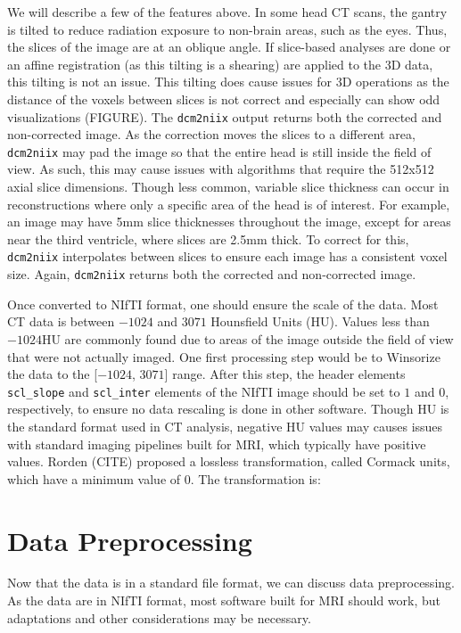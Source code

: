 \documentclass[]{elsarticle} %
\begin{document}
We will describe a few of the features above. In some head CT scans, the
gantry is tilted to reduce radiation exposure to non-brain areas, such
as the eyes. Thus, the slices of the image are at an oblique angle. If
slice-based analyses are done or an affine registration (as this tilting
is a shearing) are applied to the 3D data, this tilting is not an issue.
This tilting does cause issues for 3D operations as the distance of the
voxels between slices is not correct and especially can show odd
visualizations (FIGURE). The \texttt{dcm2niix} output returns both the
corrected and non-corrected image. As the correction moves the slices to
a different area, \texttt{dcm2niix} may pad the image so that the entire
head is still inside the field of view. As such, this may cause issues
with algorithms that require the 512x512 axial slice dimensions. Though
less common, variable slice thickness can occur in reconstructions where
only a specific area of the head is of interest. For example, an image
may have 5mm slice thicknesses throughout the image, except for areas
near the third ventricle, where slices are 2.5mm thick. To correct for
this, \texttt{dcm2niix} interpolates between slices to ensure each image
has a consistent voxel size. Again, \texttt{dcm2niix} returns both the
corrected and non-corrected image.

Once converted to NIfTI format, one should ensure the scale of the data.
Most CT data is between \(-1024\) and \(3071\) Hounsfield Units (HU).
Values less than \(-1024\)HU are commonly found due to areas of the
image outside the field of view that were not actually imaged. One first
processing step would be to Winsorize the data to the {[}\(-1024\),
\(3071\){]} range. After this step, the header elements
\texttt{scl\_slope} and \texttt{scl\_inter} elements of the NIfTI image
should be set to \(1\) and \(0\), respectively, to ensure no data
rescaling is done in other software. Though HU is the standard format
used in CT analysis, negative HU values may causes issues with standard
imaging pipelines built for MRI, which typically have positive values.
Rorden (CITE) proposed a lossless transformation, called Cormack units,
which have a minimum value of \(0\). The transformation is:

\hypertarget{data-preprocessing}{%
\section{Data Preprocessing}\label{data-preprocessing}}

Now that the data is in a standard file format, we can discuss data
preprocessing. As the data are in NIfTI format, most software built for
MRI should work, but adaptations and other considerations may be
necessary.
\end{document}
